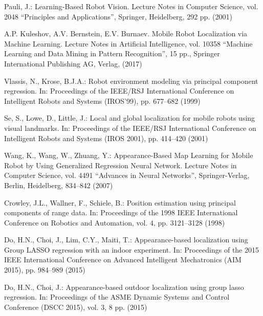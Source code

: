 \documentclass[conference]{IEEEtran} %
\begin{document}
\begin{thebibliography}{100}
Pauli, J.: Learning-Based Robot Vision. Lecture Notes in Computer Science, vol. 2048 ``Principles and Applications'', Springer, Heidelberg, 292 pp. (2001)

A.P. Kuleshov, A.V. Bernstein, E.V. Burnaev. Mobile Robot Localization via Machine Learning. Lecture Notes in Artificial Intelligence, vol. 10358 “Machine Learning and Data Mining in Pattern Recognition”, 15 pp., Springer International Publishing AG, Verlag, (2017)

Vlassis, N., Krose, B.J.A.: Robot environment modeling via principal component regression. In: Proceedings of the IEEE/RSJ International Conference on Intelligent Robots and Systems (IROS'99), pp. 677--682 (1999)

Se, S., Lowe, D., Little, J.: Local and global localization for mobile robots using visual landmarks. In: Proceedings of the IEEE/RSJ International Conference on Intelligent Robots and Systems (IROS 2001), pp. 414--420 (2001)

Wang, K., Wang, W., Zhuang, Y.: Appearance-Based Map Learning for Mobile Robot by Using Generalized Regression Neural Network. Lecture Notes in Computer Science, vol. 4491 ``Advances in Neural Networks'', Springer-Verlag, Berlin, Heidelberg, 834--842 (2007)

Crowley, J.L., Wallner, F., Schiele, B.: Position estimation using principal components of range data. In: Proceedings of the 1998 IEEE International Conference on Robotics and Automation, vol. 4, pp. 3121--3128 (1998)

Do, H.N., Choi, J., Lim, C.Y., Maiti, T.: Appearance-based localization using Group LASSO regression with an indoor experiment. In: Proceedings of the 2015 IEEE International Conference on Advanced Intelligent Mechatronics (AIM 2015), pp. 984--989 (2015)

Do, H.N., Choi, J.: Appearance-based outdoor localization using group lasso regression. In: Proceedings of the ASME Dynamic Systems and Control Conference (DSCC 2015), vol. 3, 8 pp. (2015)


\end{thebibliography}
\end{document}
